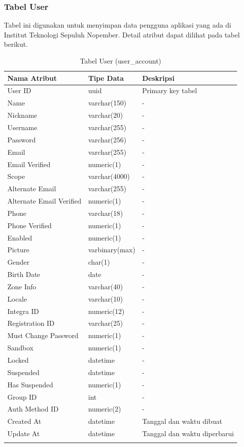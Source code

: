 \subsubsection{Tabel User}
\par Tabel ini digunakan untuk menyimpan data pengguna aplikasi yang ada di Institut Teknologi Sepuluh Nopember. Detail atribut dapat dilihat pada tabel berikut.
\begin{longtable}{|p{2.5cm}|p{2cm}|p{4.5cm}|}
    \hline
    \textbf{Nama Atribut} & \textbf{Tipe Data} & \textbf{Deskripsi} \\ \hline
    User ID & uuid & Primary key tabel \\ \hline
    Name & varchar(150) & - \\ \hline
    Nickname & varchar(20) & - \\ \hline
    Username & varchar(255) & - \\ \hline
    Password & varchar(256) & - \\ \hline
    Email & varchar(255) & - \\ \hline
    Email Verified & numeric(1) & - \\ \hline
    Scope & varchar(4000) & - \\ \hline
    Alternate Email & varchar(255) & - \\ \hline
    Alternate Email Verified & numeric(1) & - \\ \hline
    Phone & varchar(18) & - \\ \hline
    Phone Verified & numeric(1) & - \\ \hline
    Enabled & numeric(1) & - \\ \hline
    Picture & varbinary(max) & - \\ \hline
    Gender & char(1) & - \\ \hline
    Birth Date & date & - \\ \hline
    Zone Info & varchar(40) & - \\ \hline
    Locale & varchar(10) & - \\ \hline
    Integra ID & numeric(12) & - \\ \hline
    Registration ID & varchar(25) & - \\ \hline
    Must Change Password & numeric(1) & - \\ \hline
    Sandbox & numeric(1) & - \\ \hline
    Locked & datetime & - \\ \hline
    Suspended & datetime & - \\ \hline
    Has Suspended & numeric(1) & - \\ \hline
    Group ID & int & - \\ \hline
    Auth Method ID & numeric(2) & - \\ \hline
    Created At & datetime & Tanggal dan waktu dibuat \\ \hline
    Update At & datetime & Tanggal dan waktu diperbarui \\ \hline
    \caption{Tabel User (user\_account)}
\end{longtable}

